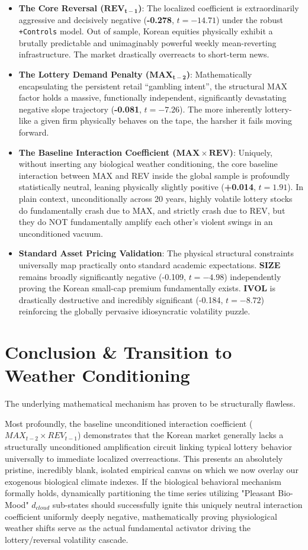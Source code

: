 \documentclass[11pt,a4paper]{article}
\begin{document}
\begin{itemize}
    \item \textbf{The Core Reversal ($\mathbf{REV_{t-1}}$)}: The localized coefficient is extraordinarily aggressive and decisively negative (\textbf{-0.278}, $t = -14.71$) under the robust \texttt{+Controls} model. Out of sample, Korean equities physically exhibit a brutally predictable and unimaginably powerful weekly mean-reverting infrastructure. The market drastically overreacts to short-term news.
    \item \textbf{The Lottery Demand Penalty ($\mathbf{MAX_{t-2}}$)}: Mathematically encapsulating the persistent retail ``gambling intent'', the structural MAX factor holds a massive, functionally independent, significantly devastating negative slope trajectory (\textbf{-0.081}, $t = -7.26$). The more inherently lottery-like a given firm physically behaves on the tape, the harsher it fails moving forward.
    \item \textbf{The Baseline Interaction Coefficient ($\mathbf{MAX \times REV}$)}: Uniquely, without inserting any biological weather conditioning, the core baseline interaction between MAX and REV inside the global sample is profoundly statistically neutral, leaning physically slightly positive (\textbf{+0.014}, $t = 1.91$). In plain context, unconditionally across 20 years, highly volatile lottery stocks do fundamentally crash due to MAX, and strictly crash due to REV, but they do NOT fundamentally amplify each other's violent swings in an unconditioned vacuum. 
    \item \textbf{Standard Asset Pricing Validation}: The physical structural constraints universally map practically onto standard academic expectations. \textbf{SIZE} remains broadly significantly negative (-0.109, $t = -4.98$) independently proving the Korean small-cap premium fundamentally exists. \textbf{IVOL} is drastically destructive and incredibly significant (-0.184, $t = -8.72$) reinforcing the globally pervasive idiosyncratic volatility puzzle.
\end{itemize}

\section{Conclusion \& Transition to Weather Conditioning}
The underlying mathematical mechanism has proven to be structurally flawless. 

Most profoundly, the baseline unconditioned interaction coefficient ($MAX_{t-2} \times REV_{t-1}$) demonstrates that the Korean market generally lacks a structurally unconditioned amplification circuit linking typical lottery behavior universally to immediate localized overreactions. This presents an absolutely pristine, incredibly blank, isolated empirical canvas on which we now overlay our exogenous biological climate indexes. If the biological behavioral mechanism formally holds, dynamically partitioning the time series utilizing "Pleasant Bio-Mood" $d_{cloud}$ sub-states should successfully ignite this uniquely neutral interaction coefficient uniformly deeply negative, mathematically proving physiological weather shifts serve as the actual fundamental activator driving the lottery/reversal volatility cascade.
\end{document}
